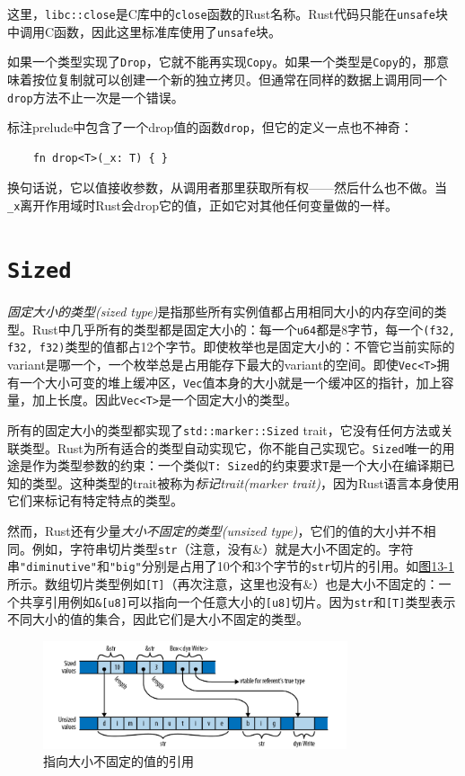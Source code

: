 这里，\texttt{libc::close}是C库中的\texttt{close}函数的Rust名称。Rust代码只能在\texttt{unsafe}块中调用C函数，因此这里标准库使用了\texttt{unsafe}块。

如果一个类型实现了\texttt{Drop}，它就不能再实现\texttt{Copy}。如果一个类型是\texttt{Copy}的，那意味着按位复制就可以创建一个新的独立拷贝。但通常在同样的数据上调用同一个\texttt{drop}方法不止一次是一个错误。

标注prelude中包含了一个drop值的函数\texttt{drop}，但它的定义一点也不神奇：
\begin{verbatim}
    fn drop<T>(_x: T) { }
\end{verbatim}

换句话说，它以值接收参数，从调用者那里获取所有权——然后什么也不做。当\texttt{\_x}离开作用域时Rust会drop它的值，正如它对其他任何变量做的一样。

\section{\texttt{Sized}}\label{sized}

\emph{固定大小的类型(sized type)}是指那些所有实例值都占用相同大小的内存空间的类型。Rust中几乎所有的类型都是固定大小的：每一个\texttt{u64}都是8字节，每一个\texttt{(f32, f32, f32)}类型的值都占12个字节。即使枚举也是固定大小的：不管它当前实际的variant是哪一个，一个枚举总是占用能存下最大的variant的空间。即使\texttt{Vec<T>}拥有一个大小可变的堆上缓冲区，\texttt{Vec}值本身的大小就是一个缓冲区的指针，加上容量，加上长度。因此\texttt{Vec<T>}是一个固定大小的类型。

所有的固定大小的类型都实现了\texttt{std::marker::Sized} trait，它没有任何方法或关联类型。Rust为所有适合的类型自动实现它，你不能自己实现它。\texttt{Sized}唯一的用途是作为类型参数的约束：一个类似\texttt{T: Sized}的约束要求\texttt{T}是一个大小在编译期已知的类型。这种类型的trait被称为\emph{标记trait(marker trait)}，因为Rust语言本身使用它们来标记有特定特点的类型。

然而，Rust还有少量\emph{大小不固定的类型(unsized type)}，它们的值的大小并不相同。例如，字符串切片类型\texttt{str}（注意，没有\&）就是大小不固定的。字符串\texttt{"diminutive"}和\texttt{"big"}分别是占用了10个和3个字节的\texttt{str}切片的引用。如\hyperref[f13-1]{图13-1}所示。数组切片类型例如\texttt{[T]}（再次注意，这里也没有\&）也是大小不固定的：一个共享引用例如\texttt{\&[u8]}可以指向一个任意大小的\texttt{[u8]}切片。因为\texttt{str}和\texttt{[T]}类型表示不同大小的值的集合，因此它们是大小不固定的类型。

\begin{figure}[htbp]
    \centering
    \includegraphics[width=0.8\textwidth]{../img/f13-1.png}
    \caption{指向大小不固定的值的引用}
    \label{f13-1}
\end{figure}

